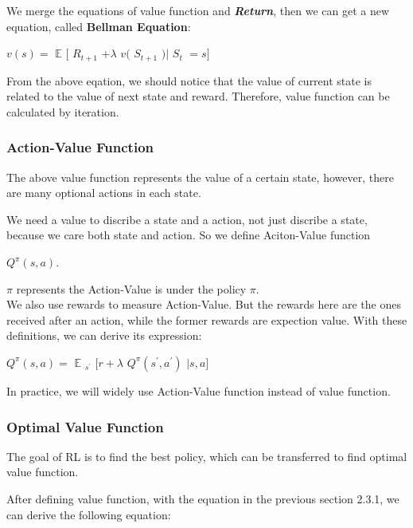 \documentclass[10pt,twocolumn,letterpaper]{article}
\begin{document}
	We merge the equations of value function and \textbf{\textit{Return}}, then we can get a new equation, called \textbf{Bellman Equation}:
	
	\begin{center}
		$v(s)=$
		$\mathbb{E}$
		$[$
		\textbf{\textit{$R_{t+1}$}}
		$+\lambda$
		$v($
		\textbf{\textit{$S_{t+1}$}}
		$)|$
		\textbf{\textit{$S_{t}$}}
		$=s]$
	\end{center}
	
	From the above eqation, we should notice that the value of current state is related to the value of next state and reward. Therefore, value function can be calculated by iteration.
	
	\subsubsection{Action-Value Function}
	The above value function represents the value of a certain state, however, there are many optional actions in each state.
	
	We need a value to discribe a state and a action, not just discribe a state, because we care both state and action. So we define Aciton-Value function
	
	\begin{center}
		$Q^{\pi}(s,a)$.
	\end{center}
	
	$\pi$ represents the Action-Value is under the policy $\pi$.\\
	
	We also use rewards to measure Action-Value. But the rewards here are the ones received after an action, while the former rewards are expection value. With these definitions, we can derive its expression:
	
	\begin{center}
		$Q^{\pi}(s,a)=$
		$\mathbb{E}$
		$_{s^{'}}$
		$[r+\lambda$
		$Q^{\pi}(s^{'},a^{'})$
		$|s,a]$
	\end{center}
	
	In practice, we will widely use Action-Value function instead of value function.
	
	\subsubsection{Optimal Value Function}
	The goal of RL is to find the best policy, which can be transferred to find optimal value function.
	
	After defining value function, with the equation in the previous section 2.3.1, we can derive the following equation:
	
\end{document}
